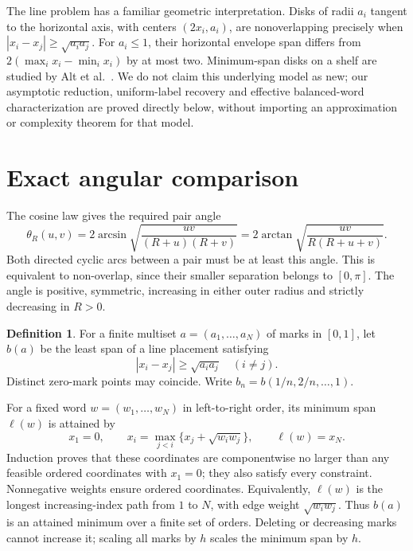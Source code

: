 \documentclass[11pt]{article}
\theoremstyle{definition}\newtheorem{definition}[theorem]{Definition}
\theoremstyle{remark}\newtheorem{remark}[theorem]{Remark}
\DeclareMathOperator{\atan}{arctan}
\DeclareMathOperator{\asin}{arcsin}
\begin{document}
The line problem has a familiar geometric interpretation. Disks of radii
$a_i$ tangent to the horizontal axis, with centers $(2x_i,a_i)$, are
nonoverlapping precisely when $|x_i-x_j|\ge\sqrt{a_i a_j}$.
For $a_i\le1$, their horizontal envelope span differs from
$2(\max_i x_i-\min_i x_i)$ by at most two. Minimum-span disks on a shelf
are studied by
Alt et al.\ \cite{shelf}. We do not claim this underlying model as new;
our asymptotic reduction, uniform-label recovery and effective balanced-word
characterization are proved directly below, without importing an approximation
or complexity theorem for that model.

\section{Exact angular comparison}\label{sec:line}

The cosine law gives the required pair angle
\begin{equation}\label{eq:theta}
 \theta_R(u,v)=2\asin\sqrt{\frac{uv}{(R+u)(R+v)}}
 =2\atan\sqrt{\frac{uv}{R(R+u+v)}}.
\end{equation}
Both directed cyclic arcs between a pair must be at least this angle.
This is equivalent to non-overlap, since their smaller separation belongs
to $[0,\pi]$. The angle is positive, symmetric, increasing in either
outer radius and strictly decreasing in $R>0$.

\begin{definition}
For a finite multiset $a=(a_1,\ldots,a_N)$ of marks in $[0,1]$, let $b(a)$
be the least span of a line placement satisfying
\begin{equation}\label{eq:line}
 |x_i-x_j|\ge\sqrt{a_i a_j}\quad(i\ne j).
\end{equation}
Distinct zero-mark points may coincide. Write $b_n=b(1/n,2/n,\ldots,1)$.
\end{definition}

For a fixed word $w=(w_1,\ldots,w_N)$ in left-to-right order, its minimum
span $\ell(w)$ is attained by
\begin{equation}\label{eq:recurrence}
 x_1=0,\qquad x_i=\max_{j<i}\{x_j+\sqrt{w_iw_j}\},\qquad \ell(w)=x_N.
\end{equation}
Induction proves that these coordinates are componentwise no larger than
any feasible ordered coordinates with $x_1=0$; they also satisfy every
constraint. Nonnegative weights ensure ordered coordinates. Equivalently,
$\ell(w)$ is the longest increasing-index path from $1$ to $N$, with
edge weight $\sqrt{w_iw_j}$. Thus $b(a)$ is an attained minimum over a
finite set of orders. Deleting or decreasing marks cannot increase it;
scaling all marks by $h$ scales the minimum span by $h$.
\end{document}
